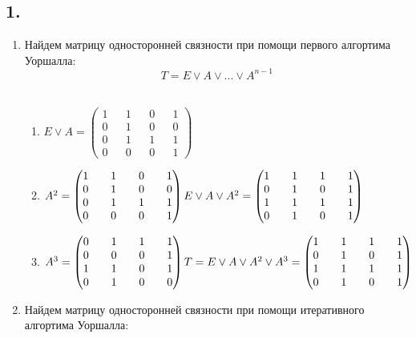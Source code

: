 \documentclass{article}
\begin{document}
\subsection*{1.}
\begin{enumerate}		
\item Найдем матрицу односторонней связности при помощи первого алгортима Уоршалла: \\ 
	\[ T = E \lor A \lor ... \lor A^{n-1} \] \\
	\begin{enumerate}
	\item
	$
		E \lor A =
		\begin{pmatrix}
		1 && 1 && 0 && 1 \\ 
		0 && 1 && 0 && 0 \\ 
		0 && 1 && 1 && 1 \\ 
		0 && 0 && 0 && 1 
		\end{pmatrix}
	$
	\item
	$
		A^2 = 
		\begin{pmatrix}
		1 && 1 && 0 && 1 \\ 
		0 && 1 && 0 && 0 \\ 
		0 && 1 && 1 && 1 \\ 
		0 && 0 && 0 && 1
		\end{pmatrix}
		\newline
		E \lor A \lor A^2 = 
		\begin{pmatrix}
		1 && 1 && 1 && 1 \\ 
		0 && 1 && 0 && 1 \\ 
		1 && 1 && 1 && 1 \\ 
		0 && 1 && 0 && 1
		\end{pmatrix}
	$
	\item
	$
		A^3 = 
		\begin{pmatrix}
		0 && 1 && 1 && 1 \\ 
		0 && 0 && 0 && 1 \\ 
		1 && 1 && 0 && 1 \\ 
		0 && 1 && 0 && 0
		\end{pmatrix}
		\newline
		T = E \lor A \lor A^2 \lor A^3 = 
		\begin{pmatrix}
		1 && 1 && 1 && 1 \\ 
		0 && 1 && 0 && 1 \\ 
		1 && 1 && 1 && 1 \\ 
		0 && 1 && 0 && 1
		\end{pmatrix}
	$
	\end{enumerate}
\item Найдем матрицу односторонней связности при помощи итеративного алгортима Уоршалла: \\ 

\end{enumerate}
\end{document}
